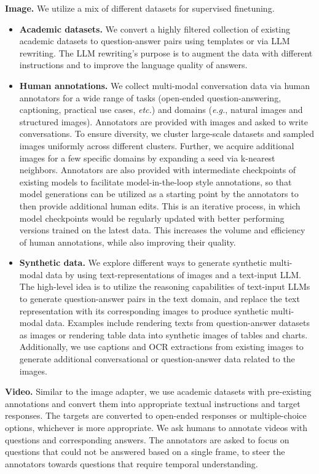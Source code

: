 \documentclass[dvipsnames]{fairmeta}
\begin{document}
\textbf{Image.} We utilize a mix of different datasets for supervised finetuning.
\begin{itemize}
\item \textbf{Academic datasets.} We convert a highly filtered collection of existing academic datasets to question-answer pairs using templates or via LLM rewriting. The LLM rewriting's purpose is to augment the data with different instructions and to improve the language quality of answers.

\item \textbf{Human annotations.} We collect multi-modal conversation data via human annotators for a wide range of tasks (open-ended question-answering, captioning, practical use cases, \textit{etc.}) and domains (\textit{e.g.}, natural images and structured images). Annotators are provided with images and asked to write conversations. To ensure diversity, we cluster large-scale datasets and sampled images uniformly across different clusters. Further, we acquire additional images for a few specific domains by expanding a seed via k-nearest neighbors. Annotators are also provided with intermediate checkpoints of existing models to facilitate model-in-the-loop style annotations, so that model generations can be utilized as a starting point by the annotators to then provide additional human edits. This is an iterative process, in which model checkpoints would be regularly updated with better performing versions trained on the latest data. This increases the volume and efficiency of human annotations, while also improving their quality.

\item \textbf{Synthetic data.} We explore different ways to generate synthetic multi-modal data by using text-representations of images and a text-input LLM. The high-level idea is to utilize the reasoning capabilities of text-input LLMs to generate question-answer pairs in the text domain, and replace the text representation with its corresponding images to produce synthetic multi-modal data. Examples include rendering texts from question-answer datasets as images or rendering table data into synthetic images of tables and charts. Additionally, we use captions and OCR extractions from existing images to generate additional conversational or question-answer data related to the images.
\end{itemize}

\textbf{Video.} Similar to the image adapter, we use academic datasets with pre-existing annotations and convert them into appropriate textual instructions and target responses.
The targets are converted to open-ended responses or multiple-choice options, whichever is more appropriate.
We ask humans to annotate videos with questions and corresponding answers.
The annotators are asked to focus on questions that could not be answered based on a single frame, to steer the annotators towards questions that require temporal understanding.
\end{document}
